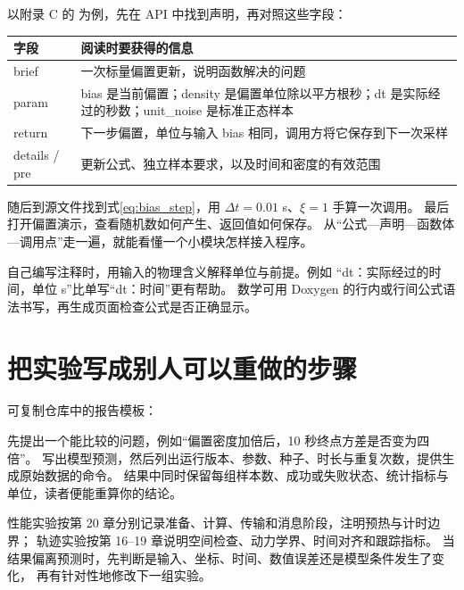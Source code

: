 以附录 C 的  为例，先在 API 中找到声明，再对照这些字段：
\begin{center}\small
\begin{tabular}{lp{10cm}}\toprule
字段 & 阅读时要获得的信息\\\midrule
brief & 一次标量偏置更新，说明函数解决的问题\\
param & bias 是当前偏置；density 是偏置单位除以平方根秒；dt 是实际经过的秒数；unit\_noise 是标准正态样本\\
return & 下一步偏置，单位与输入 bias 相同，调用方将它保存到下一次采样\\
details / pre & 更新公式、独立样本要求，以及时间和密度的有效范围\\\bottomrule
\end{tabular}
\end{center}
随后到源文件找到式\eqref{eq:bias_step}，用 $\Delta t=0.01$ s、$\xi=1$ 手算一次调用。
最后打开偏置演示，查看随机数如何产生、返回值如何保存。
从“公式—声明—函数体—调用点”走一遍，就能看懂一个小模块怎样接入程序。

自己编写注释时，用输入的物理含义解释单位与前提。例如
“dt：实际经过的时间，单位 s”比单写“dt：时间”更有帮助。
数学可用 Doxygen 的行内或行间公式语法书写，再生成页面检查公式是否正确显示。

\section{把实验写成别人可以重做的步骤}
可复制仓库中的报告模板：
\begin{center}\end{center}
先提出一个能比较的问题，例如“偏置密度加倍后，10 秒终点方差是否变为四倍”。
写出模型预测，然后列出运行版本、参数、种子、时长与重复次数，提供生成原始数据的命令。
结果中同时保留每组样本数、成功或失败状态、统计指标与单位，读者便能重算你的结论。

性能实验按第 20 章分别记录准备、计算、传输和消息阶段，注明预热与计时边界；
轨迹实验按第 16--19 章说明空间检查、动力学界、时间对齐和跟踪指标。
当结果偏离预测时，先判断是输入、坐标、时间、数值误差还是模型条件发生了变化，
再有针对性地修改下一组实验。

